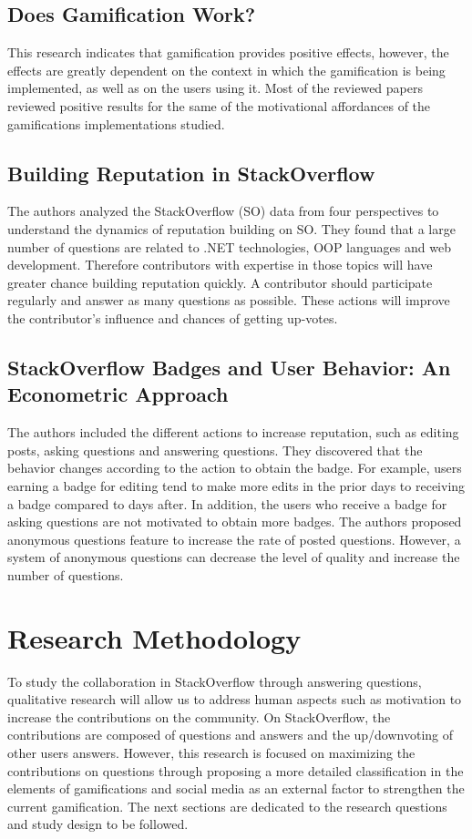 \documentclass{sigchi}
\begin{document}
\subsection{Does Gamification Work?}

This research indicates that gamification provides positive effects, however,
the effects are greatly dependent on the context in which the gamification is
being implemented, as well as on the users using it. Most of the reviewed
papers reviewed positive results for the same of the motivational affordances
of the gamifications implementations studied.

\subsection{Building Reputation in StackOverflow}

The authors analyzed the StackOverflow (SO) data from four perspectives to
understand the dynamics of reputation building on SO. They found that a large
number of questions are related to .NET technologies, OOP languages and web
development. Therefore contributors with expertise in those topics will have
greater chance building reputation quickly. A contributor should participate
regularly and answer as many questions as possible. These actions will improve
the contributor’s influence and chances of getting up-votes.

\subsection{StackOverflow Badges and User Behavior: An Econometric Approach}

The authors included the different actions to increase reputation, such as
editing posts, asking questions and answering questions. They discovered that
the behavior changes according to the action to obtain the badge. For example,
users earning a badge for editing tend to make more edits in the prior days to
receiving a badge compared to days after. In addition, the users who receive a
badge for asking questions are not motivated to obtain more badges. The authors
proposed anonymous questions feature to increase the rate of posted questions.
However, a system of anonymous questions can decrease the level of quality and
increase the number of questions.


\section{Research Methodology}
To study the collaboration in StackOverflow through answering questions,
qualitative research will allow us to address human aspects such as motivation
to increase the contributions on the community. On StackOverflow, the
contributions are composed of questions and answers and the up/downvoting of
other users answers. However, this research is
focused on maximizing the contributions on questions through proposing a more
detailed classification in the elements of gamifications and social media as an
external factor to strengthen the current gamification. The next sections are
dedicated to the research questions and study design to be followed.
\end{document}
